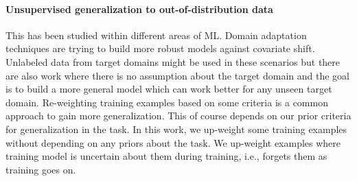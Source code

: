 \paragraph{Unsupervised generalization to out-of-distribution data}
This has been studied within different areas of ML. 
Domain adaptation techniques are trying to build more robust models against covariate shift.
Unlabeled data from target domains might be used in these scenarios but there are also work 
where there is no assumption about the target domain and the goal is to build a more general model which can work better for any unseen target domain. 
Re-weighting training examples based on some criteria is a common approach to gain more generalization.
This of course depends on our prior criteria for generalization in the task.
In this work, we up-weight some training examples without depending on any priors about the task. 
We up-weight examples where training model is uncertain about them during training, i.e., forgets them as training goes on.


\iffalse
\subsection{Comparing our methodology to related work}
\begin{itemize}
    \item The recent work to tackle the brittleness of MNLI trained models all are built based on the prior knowledge about the biases
    in the training dataset. 
    
    
    Notably, \newcite{clark2019dont} introduce a 2 stage process as:
\begin{quote}
        (1)
train a naive model that makes predictions exclusively based on dataset biases, and (2) train
a robust model as part of an ensemble with the
naive one in order to encourage it to focus on
other patterns in the data that are more likely to
generalize
    \end{quote}
    
    \newcite{he2019unlearn} employs a similar approach and uses a bag-of-word, a hypotheis-only and a manually-built bias models, and fits 
    their target model to the residual of these weak baselines.
    
    \newcite{mahabadi2019simple} takes a very similar approach as in \newcite{clark2019dont}.
    
    In compared to these methods, we do not rely on known biases and prior knowledge about the dataset.
    We do however rely on weaker models to compute a more diverse set of forgettables.

\end{itemize}
\fi